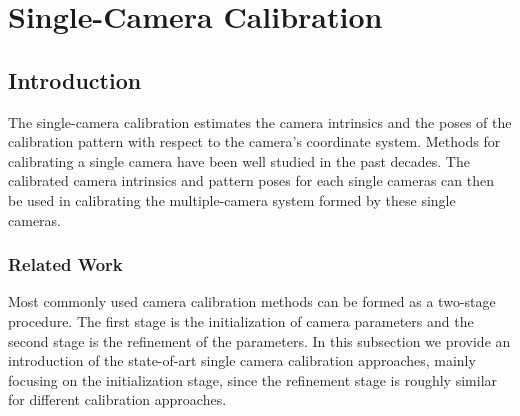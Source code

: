 \documentclass{report}
\begin{document}
\chapter{Single-Camera Calibration}
\label{singleSec}

\section{Introduction}
The single-camera calibration estimates the camera intrinsics and the poses of the calibration pattern with respect to the camera's coordinate system. Methods for calibrating a single camera have been well studied in the past decades. The calibrated camera intrinsics and pattern poses for each single cameras can then be used in calibrating the multiple-camera system formed by these single cameras. 



\subsection{Related Work}
Most commonly used camera calibration methods can be formed as a two-stage procedure. The first stage is the initialization of camera parameters and the second stage is the refinement of the parameters. In this subsection we provide an introduction of the state-of-art single camera calibration approaches, mainly focusing on the initialization stage, since the refinement stage is roughly similar for different calibration approaches. 
\end{document}
